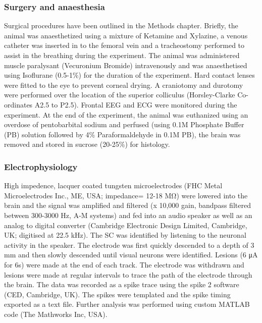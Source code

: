 	\subsubsection{Surgery and anaesthesia}
	Surgical procedures have been outlined in the Methods chapter. Briefly, the animal was anaesthetized using a mixture of Ketamine and Xylazine, a venous catheter was inserted in to the femoral vein and a tracheostomy performed to assist in the breathing during the experiment. The animal was administered muscle paralysant (Vecuronium Bromide) intravenously and was anaesthetised using Isoflurane (0.5-1\%) for the duration of the experiment. Hard contact lenses were fitted to the eye to prevent corneal drying. A craniotomy and durotomy were performed over the location of the superior colliculus (Horsley-Clarke Co-ordinates A2.5 to P2.5). Frontal EEG and ECG were monitored during the experiment. At the end of the experiment, the animal was euthanized using an overdose of pentobarbital sodium and perfused (using 0.1M Phosphate Buffer (PB) solution followed by 4\% Paraformaldehyde in 0.1M PB), the brain was removed and stored in sucrose (20-25\%) for histology.
	
	\subsubsection{Electrophysiology}
	High impedence, lacquer coated tungsten microelectrodes (FHC Metal Microelectrodes Inc., ME, USA; impedance= 12-18 MΩ) were lowered into the brain and the signal was amplified and filtered (x 10,000 gain, bandpass filtered between 300-3000 Hz, A-M systems) and fed into an audio speaker as well as an analog to digital converter (Cambridge Electronic Design Limited, Cambridge, UK; digitised at 22.5 kHz). The SC was identified by listening to the neuronal activity in the speaker. The electrode was first quickly descended to a depth of 3 mm and then slowly descended until visual neurons were identified. Lesions (6 μA for 6s) were made at the end of each track. The electrode was withdrawn and lesions were made at regular intervals to trace the path of the electrode through the brain. The data was recorded as a spike trace using the spike 2 software (CED, Cambridge, UK). The spikes were templated and the spike timing exported as a text file. Further analysis was performed using custom MATLAB code (The Mathworks Inc, USA).
	
